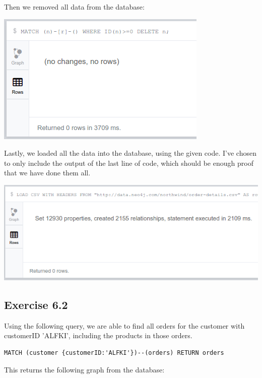 \documentclass{article}
\begin{document}
Then we removed all data from the database:

\includegraphics[scale=0.5]{delete_all.png}

Lastly, we loaded all the data into the database, using the given code.
I've chosen to only include the output of the last line of code, which should be
enough proof that we have done them all.

\includegraphics[scale=0.5]{insert_data.png}

\subsection{Exercise 6.2}
\label{sub:Exercise 6.2}

Using the following query, we are able to find all orders for the customer with
customerID 'ALFKI', including the products in those orders.

\begin{lstlisting}
MATCH (customer {customerID:'ALFKI'})--(orders) RETURN orders
\end{lstlisting}

This returns the following graph from the database:
\end{document}
